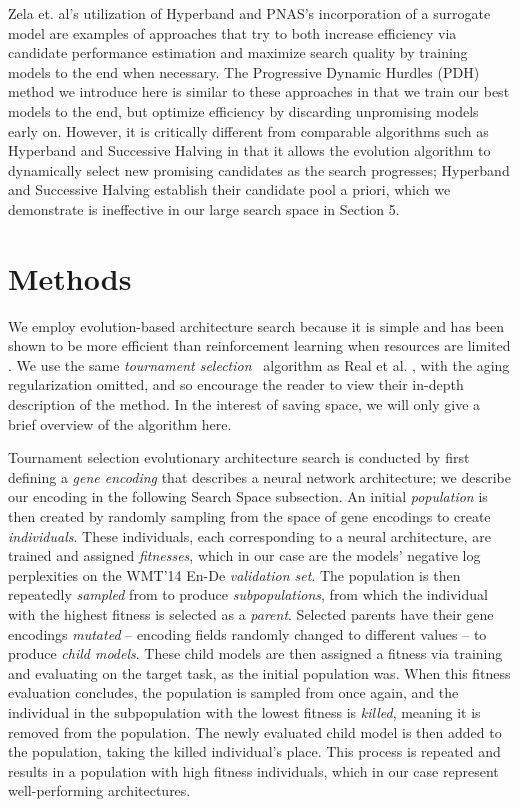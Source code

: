 \documentclass{article}
\begin{document}
Zela et. al's  utilization of Hyperband \cite{li17} and PNAS's \cite{liu18} incorporation of a surrogate model are examples of approaches that try to both increase efficiency via candidate performance estimation and maximize search quality by training models to the end when necessary. The Progressive Dynamic Hurdles (PDH) method we introduce here is similar to these approaches in that we train our best models to the end, but optimize efficiency by discarding unpromising models early on. However, it is critically different from comparable algorithms such as Hyperband and Successive Halving \cite{jamieson16} in that it allows the evolution algorithm to dynamically select new promising candidates as the search progresses; Hyperband and Successive Halving establish their candidate pool a priori, which we demonstrate is ineffective in our large search space in Section 5.


\section{Methods}
We employ evolution-based architecture search because it is simple and has been shown to be more efficient than reinforcement learning when resources are limited \cite{real19}. We use the same \textit{tournament selection}~\cite{goldberg91} algorithm as Real et al. , with the aging regularization omitted, and so encourage the reader to view their in-depth description of the method. In the interest of saving space, we will only give a brief overview of the algorithm here. 

Tournament selection evolutionary architecture search is conducted by first defining a \textit{gene encoding} that describes a neural network architecture; we describe our encoding in the following Search Space subsection. An initial \textit{population} is then created by randomly sampling from the space of gene encodings to create \textit{individuals}. These individuals, each corresponding to a neural architecture, are trained and assigned \textit{fitnesses}, which in our case are the models' negative log perplexities on the WMT'14 En-De \textit{validation set}. The population is then repeatedly \textit{sampled} from to produce \textit{subpopulations}, from which the individual with the highest fitness is selected as a \textit{parent}. Selected parents have their gene encodings \textit{mutated} -- encoding fields randomly changed to different values -- to produce \textit{child models}. These child models are then assigned a fitness via training and evaluating on the target task, as the initial population was. When this fitness evaluation concludes, the population is sampled from once again, and the individual in the subpopulation with the lowest fitness is \textit{killed}, meaning it is removed from the population. The newly evaluated child model is then added to the population, taking the killed individual's place. This process is repeated and results in a population with high fitness individuals, which in our case represent well-performing architectures.
\end{document}

